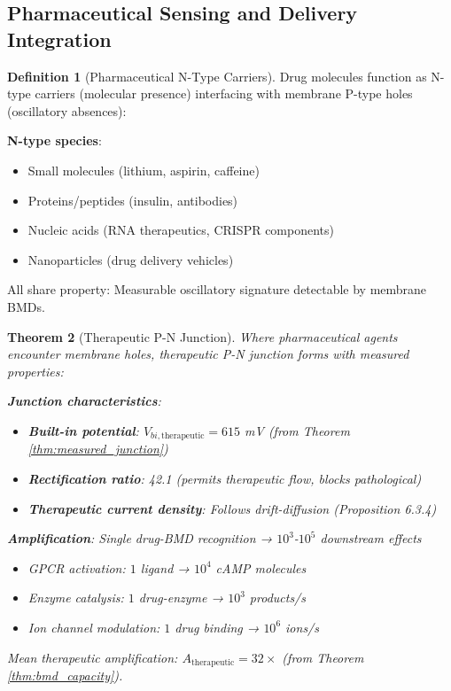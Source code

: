 \documentclass[11pt,a4paper]{article}
\newtheorem{theorem}{Theorem}[section]
\theoremstyle{definition}
\newtheorem{definition}[theorem]{Definition}
\theoremstyle{remark}
\begin{document}
\subsection{Pharmaceutical Sensing and Delivery Integration}

\begin{definition}[Pharmaceutical N-Type Carriers]
Drug molecules function as N-type carriers (molecular presence) interfacing with membrane P-type holes (oscillatory absences):

\textbf{N-type species}:
\begin{itemize}
\item Small molecules (lithium, aspirin, caffeine)
\item Proteins/peptides (insulin, antibodies)
\item Nucleic acids (RNA therapeutics, CRISPR components)
\item Nanoparticles (drug delivery vehicles)
\end{itemize}

All share property: Measurable oscillatory signature detectable by membrane BMDs.
\end{definition}

\begin{theorem}[Therapeutic P-N Junction]
Where pharmaceutical agents encounter membrane holes, therapeutic P-N junction forms with measured properties:

\textbf{Junction characteristics}:
\begin{itemize}
\item \textbf{Built-in potential}: $V_{bi,\text{therapeutic}} = 615$ mV (from Theorem \ref{thm:measured_junction})
\item \textbf{Rectification ratio}: 42.1 (permits therapeutic flow, blocks pathological)
\item \textbf{Therapeutic current density}: Follows drift-diffusion (Proposition 6.3.4)
\end{itemize}

\textbf{Amplification}: Single drug-BMD recognition → $10^3$-$10^5$ downstream effects
\begin{itemize}
\item GPCR activation: $1$ ligand → $10^4$ cAMP molecules
\item Enzyme catalysis: $1$ drug-enzyme → $10^3$ products/s
\item Ion channel modulation: $1$ drug binding → $10^6$ ions/s
\end{itemize}

Mean therapeutic amplification: $A_{\text{therapeutic}} = 32\times$ (from Theorem \ref{thm:bmd_capacity}).
\end{theorem}
\end{document}
